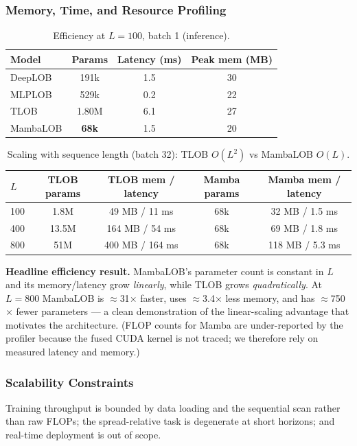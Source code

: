 \documentclass[11pt]{article}
\begin{document}
\subsubsection{Memory, Time, and Resource Profiling}
\begin{table}[h]
\centering
\caption{Efficiency at $L{=}100$, batch 1 (inference).}
\begin{tabular}{@{}lccc@{}}
\toprule
Model & Params & Latency (ms) & Peak mem (MB) \\
\midrule
DeepLOB & 191k & 1.5 & 30 \\
MLPLOB & 529k & 0.2 & 22 \\
TLOB & 1.80M & 6.1 & 27 \\
MambaLOB & \textbf{68k} & 1.5 & 20 \\
\bottomrule
\end{tabular}
\end{table}
\begin{table}[h]
\centering
\caption{Scaling with sequence length (batch 32): TLOB $O(L^2)$ vs MambaLOB $O(L)$.}
\begin{tabular}{@{}lcccc@{}}
\toprule
$L$ & TLOB params & TLOB mem / latency & Mamba params & Mamba mem / latency \\
\midrule
100 & 1.8M  & 49 MB / 11 ms  & 68k & 32 MB / 1.5 ms \\
400 & 13.5M & 164 MB / 54 ms & 68k & 69 MB / 1.8 ms \\
800 & 51M   & 400 MB / 164 ms & 68k & 118 MB / 5.3 ms \\
\bottomrule
\end{tabular}
\end{table}
\textbf{Headline efficiency result.} MambaLOB's parameter count is constant in $L$ and its
memory/latency grow \emph{linearly}, while TLOB grows \emph{quadratically}. At $L{=}800$ MambaLOB is
$\approx$31$\times$ faster, uses $\approx$3.4$\times$ less memory, and has $\approx$750$\times$ fewer
parameters --- a clean demonstration of the linear-scaling advantage that motivates the architecture.
(FLOP counts for Mamba are under-reported by the profiler because the fused CUDA kernel is not traced; we
therefore rely on measured latency and memory.)
\subsubsection{Scalability Constraints}
Training throughput is bounded by data loading and the sequential scan rather than raw FLOPs; the
spread-relative task is degenerate at short horizons; and real-time deployment is out of scope.
\end{document}
